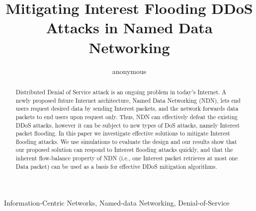 \documentclass[conference]{IEEEtran}
\title{Mitigating Interest Flooding DDoS Attacks in Named Data Networking}%
\author{anonymous}
\begin{document}
\maketitle

\begin{abstract}

Distributed Denial of Service attack is an ongoing problem in today's Internet. 
A newly proposed future Internet architecture, Named Data Networking (NDN), lets end users request desired data by sending Interest packets, and the network forwards data packets to end users upon request only. 
Thus, NDN can effectively defeat the existing DDoS attacks, however it can be subject to new types of DoS attacks, namely Interest packet flooding.  
In this paper we investigate effective solutions to mitigate Interest flooding attacks. 
We use simulations to evaluate the design and our results show that our proposed solution can respond to Interest flooding attacks quickly, and that the inherent flow-balance property of NDN (i.e., one Interest packet retrieves at most one Data packet) can be used as a basis for effective DDoS mitigation algorithms.

\end{abstract}

\begin{IEEEkeywords}
Information-Centric Networks, Named-data Networking, Denial-of-Service
\end{IEEEkeywords}




















\end{document}
